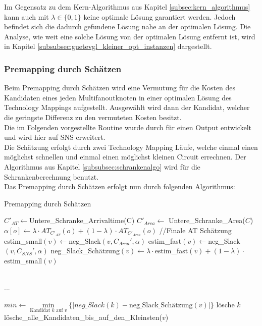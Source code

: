 \documentclass[11pt, a4paper, german]{article}
\newcommand{\TM}{Technology  Mapping }
\begin{document}
Im Gegensatz zu dem Kern-Algorithmus aus Kapitel \ref{subsec:kern_algorithmus} kann auch mit $\lambda \in \{ 0 , 1\}$ keine optimale Lösung garantiert werden. Jedoch befindet sich die dadurch gefundene Lösung nahe an der optimalen Lösung. Die Analyse, wie weit eine solche Lösung von der optimalen Lösung entfernt ist, wird in Kapitel \ref{subsubsec:guetevgl_kleiner_opt_instanzen} dargestellt.
 
\subsubsection{Premapping durch Schätzen}
\label{subsec:premapping_duch_schaetzen}
Beim Premapping durch Schätzen wird eine Vermutung für die Kosten des Kandidaten eines jeden Multifanoutknoten in einer optimalen Lösung des Technology Mappings aufgestellt. Ausgewählt wird dann der Kandidat, welcher die geringste Differenz zu den vermuteten Kosten besitzt.\\
Die im Folgenden vorgestellte Routine wurde durch \cite{Elbert} für einen Output entwickelt und wird hier auf SNS erweitert.\\
Die Schätzung erfolgt durch zwei \TM Läufe, welche einmal einen möglichst schnellen und einmal einen möglichst kleinen Circuit errechnen. Der Algorithmus aus Kapitel \ref{subsubsec:schrankenalgo} wird für die Schrankenberechnung benutzt.\\

 Das Premapping durch Schätzen erfolgt nun durch folgenden Algorithmus:\\
 
\begin{algorithm}[H]
 \LinesNumbered
 \DontPrintSemicolon
 \caption{Premapping durch Schätzen}
 $C'_{AT} \gets $Untere\_Schranke\_Arrivaltime(C)\;
$C'_{Area} \gets$ Untere\_Schranke\_Area($C$)\; 
{
	$\alpha[o] \gets \lambda \cdot AT_{C'_{AT}}(o) + (1-\lambda)\cdot AT_{C'_{Area}}(o)$ //Finale AT Sch\"atzung \;
}
 {
  estim\_small$(v) \gets $neg\_Slack$(v,C_{Area}',\alpha)$\;
  estim\_fast$(v) \gets $neg\_Slack$(v,C_{SNS}',\alpha)$\;
  neg\_Slack\_Sch\"atzung$(v) \gets \lambda \cdot $estim\_fast$(v) + (1-\lambda)\cdot$estim\_small$(v)$\;
 }
 
\ \\...\\ \;
 
  {
    $min \gets \min\limits_{\text{Kandidat }k\text{ auf }v}\{|neg\_Slack(k)-\text{neg\_Slack\_Sch\"atzung}(v)|\}$\;
    {
      {
	l\"osche $k$\;
      }
    }
    {
      lösche\_alle\_Kandidaten\_bis\_auf\_den\_Kleinsten($v$)\;
      }
   }
\end{algorithm}\ \\
 
\end{document}
